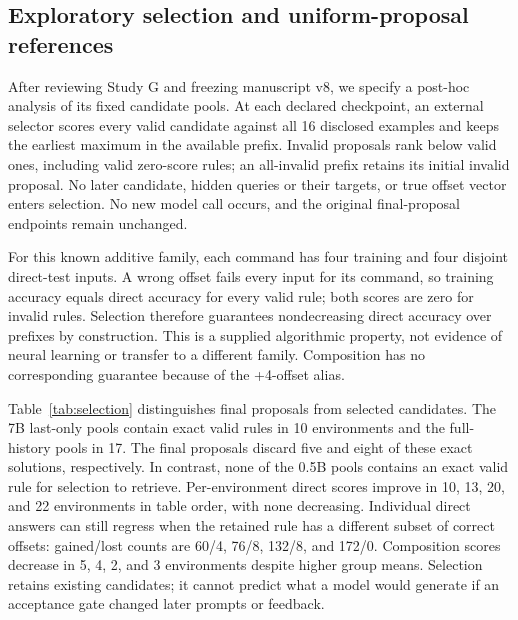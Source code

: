 \documentclass[11pt]{article}
\begin{document}
\subsection{Exploratory selection and uniform-proposal references}
After reviewing Study G and freezing manuscript v8, we specify a post-hoc
analysis of its fixed candidate pools. At each declared checkpoint, an
external selector scores every valid candidate against all 16 disclosed
examples and keeps the earliest maximum in the available prefix. Invalid
proposals rank below valid ones, including valid zero-score rules; an
all-invalid prefix retains its initial invalid proposal. No later candidate,
hidden queries or their targets, or true offset vector enters selection. No new model
call occurs, and the original final-proposal endpoints remain unchanged.

For this known additive family, each command has four training and four
disjoint direct-test inputs. A wrong offset fails every input for its command,
so training accuracy equals direct accuracy for every valid rule; both scores
are zero for invalid rules. Selection therefore guarantees nondecreasing
direct accuracy over prefixes by construction. This is a supplied algorithmic
property, not evidence of neural learning or transfer to a different family.
Composition has no corresponding guarantee because of the +4-offset alias.

Table~\ref{tab:selection} distinguishes final proposals from selected
candidates. The 7B last-only pools contain exact valid rules in 10 environments
and the full-history pools in 17. The final proposals discard five and eight
of these exact solutions, respectively. In contrast, none of the 0.5B pools
contains an exact valid rule for selection to retrieve. Per-environment direct
scores improve in 10, 13, 20, and 22 environments in table order, with none
decreasing. Individual direct answers can still regress when the retained
rule has a different subset of correct offsets: gained/lost counts are 60/4,
76/8, 132/8, and 172/0. Composition scores decrease in 5, 4, 2, and 3
environments despite higher group means. Selection retains existing candidates;
it cannot predict what a model would generate if an acceptance gate changed
later prompts or feedback.
\end{document}
